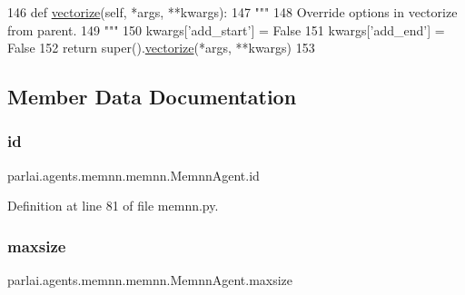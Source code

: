 \begin{DoxyCode}
146     \textcolor{keyword}{def }\hyperlink{namespaceparlai_1_1agents_1_1drqa_1_1utils_a5c76cc39e3014c7bcf9199d566dbdc0f}{vectorize}(self, *args, **kwargs):
147         \textcolor{stringliteral}{"""}
148 \textcolor{stringliteral}{        Override options in vectorize from parent.}
149 \textcolor{stringliteral}{        """}
150         kwargs[\textcolor{stringliteral}{'add\_start'}] = \textcolor{keyword}{False}
151         kwargs[\textcolor{stringliteral}{'add\_end'}] = \textcolor{keyword}{False}
152         \textcolor{keywordflow}{return} super().\hyperlink{namespaceparlai_1_1agents_1_1drqa_1_1utils_a5c76cc39e3014c7bcf9199d566dbdc0f}{vectorize}(*args, **kwargs)
153 
\end{DoxyCode}


\subsection{Member Data Documentation}
\mbox{\label{classparlai_1_1agents_1_1memnn_1_1memnn_1_1MemnnAgent_ac313c81db957b095beb84fa7ef1c1286}} 
\subsubsection{\texorpdfstring{id}{id}}
{\footnotesize\ttfamily parlai.\+agents.\+memnn.\+memnn.\+Memnn\+Agent.\+id}



Definition at line 81 of file memnn.\+py.

\mbox{\label{classparlai_1_1agents_1_1memnn_1_1memnn_1_1MemnnAgent_aff26270b3e93fc2c0a69a184774ec55e}} 
\subsubsection{\texorpdfstring{maxsize}{maxsize}}
{\footnotesize\ttfamily parlai.\+agents.\+memnn.\+memnn.\+Memnn\+Agent.\+maxsize\hspace{0.3cm}{\ttfamily [static]}}



